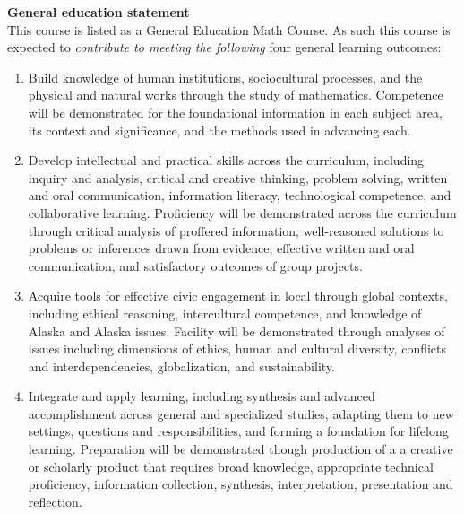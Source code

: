 \documentclass[12pt]{article}
\renewcommand{\emph}[1]{\textsf{\textbf{#1}}}
\newcommand{\localhead}[1]{\par\smallskip\textbf{#1} \smallskip\nobreak\\}%
\def\subheading#1{\localhead{\emph{#1}}}
\begin{document}

\strut

\vspace{-12pt}

\subheading{General education statement}
This course is listed as a General Education Math Course.  As such this course is expected to \textsl{contribute to meeting the following} four general learning outcomes:

\begin{enumerate}
\item Build knowledge of human institutions, sociocultural processes, and the physical and natural works through the study of mathematics.  Competence will be demonstrated for the foundational information in each subject area, its context and significance, and the methods used in advancing each.

\item Develop intellectual and practical skills across the curriculum, including inquiry and analysis, critical and creative thinking, problem solving, written and oral communication, information literacy, technological competence, and collaborative learning. Proficiency will be demonstrated across the curriculum through critical analysis of proffered information, well-reasoned solutions to problems or inferences drawn from evidence, effective written and oral communication, and satisfactory outcomes of group projects.

\item Acquire tools for effective civic engagement in local through global contexts, including ethical reasoning, intercultural competence, and knowledge of Alaska and Alaska issues.  Facility will be demonstrated through analyses of issues including dimensions of ethics, human and cultural diversity, conflicts and interdependencies, globalization, and sustainability.   

\item Integrate and apply learning, including synthesis and advanced accomplishment across general and specialized studies, adapting them to new settings, questions and responsibilities, and forming a foundation for lifelong learning. Preparation will be demonstrated though production of a a creative or scholarly product that requires broad knowledge, appropriate technical proficiency, information collection, synthesis, interpretation, presentation and reflection.
\end{enumerate}

\end{document}
